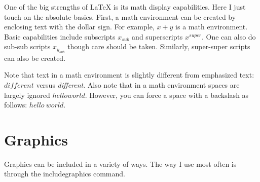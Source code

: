 \documentclass{article}
\begin{document}
One of the big strengths of LaTeX is its math display
capabilities. Here I just touch on the absolute basics. First, a
math environment can be created by enclosing text with the dollar
sign. For example, $x + y$ is a math environment. Basic
capabilities include subscripts $x_{sub}$ and superscripts
$x^{super}$. One can also do sub-sub scripts $x_{y_{sub}}$ though
care should be taken. Similarly, super-super scripts can also be
created.

Note that text in a math environment is slightly different from
emphasized text: $different$ versus \emph{different}. Also note
that in a math environment spaces are largely ignored $hello
world$. However, you can force a space with a backslash as
follows: $hello\ world$.


\section{Graphics}

Graphics can be included in a variety of ways. The way I use most
often is through the includegraphics command.

\begin{center}
\end{center}
\end{document}

